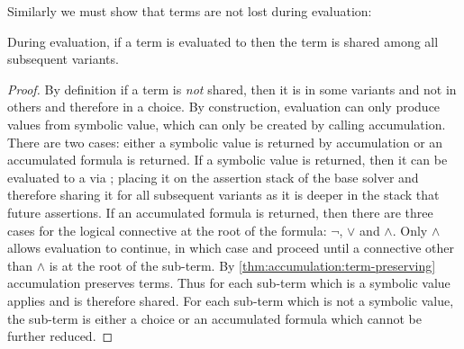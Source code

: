 Similarly we must show that terms are not lost during evaluation:

\begin{lemma}
  During evaluation, if a term is evaluated to \unit{} then the term is shared
  among all subsequent variants.
\end{lemma}
%
\begin{proof}
  By definition if a term is \emph{not} shared, then it is in some variants and
  not in others and therefore in a choice. By construction, evaluation can only
  produce \unit{} values from symbolic value, which can only be created by
  calling accumulation. There are two cases: either a symbolic value is returned
  by accumulation or an accumulated formula is returned. If a symbolic value is
  returned, then it can be evaluated to a \unit{} via \evSym{}; placing it on
  the assertion stack of the base solver and therefore sharing it for all
  subsequent variants as it is deeper in the stack that future assertions. If an
  accumulated formula is returned, then there are three cases for the logical
  connective at the root of the formula: $\neg$, $\vee$ and $\wedge$. Only
  $\wedge$ allows evaluation to continue, in which case \evSym{} and \evAnd{}
  proceed until a connective other than $\wedge$ is at the root of the sub-term.
  By \autoref{thm:accumulation:term-preserving} accumulation preserves terms.
  Thus for each sub-term which is a symbolic value \evSym{} applies and is
  therefore shared. For each sub-term which is not a symbolic value, the
  sub-term is either a choice or an accumulated formula which cannot be further
  reduced.
\end{proof}


